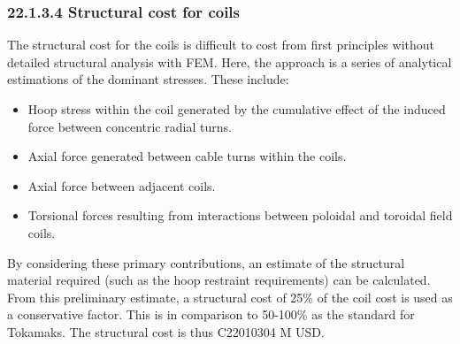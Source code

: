 \subsubsection*{22.1.3.4 Structural cost for coils}

The structural cost for the coils is difficult to cost from first principles without detailed structural analysis with FEM. Here, the approach is a series of analytical estimations of the dominant stresses. These include:

\begin{itemize}
    \item Hoop stress within the coil generated by the cumulative effect of the induced force between concentric radial turns.
    \item Axial force generated between cable turns within the coils. 
    \item Axial force between adjacent coils.
    \item Torsional forces resulting from interactions between poloidal and toroidal field coils.
\end{itemize}


By considering these primary contributions, an estimate of the structural material required (such as the hoop restraint requirements) can be calculated. From this preliminary estimate, a structural cost of 25\% of the coil cost is used as a conservative factor. This is in comparison to 50-100\% as the standard for Tokamaks. The structural cost is thus C22010304 M USD.


